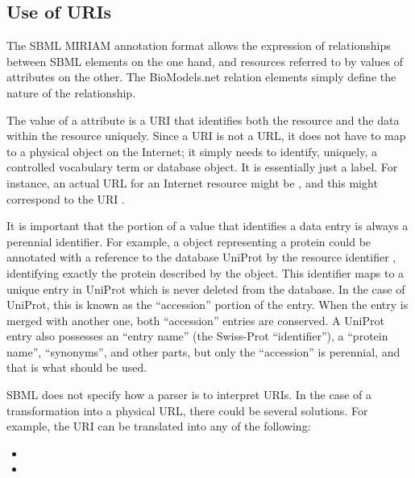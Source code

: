 
\subsection{Use of URIs}
\label{sec:uri-in-annotation}

The SBML MIRIAM annotation format allows the expression of
relationships between SBML elements on the one hand, and resources
referred to by values of  attributes on the
other.  The BioModels.net relation elements simply define the
nature of the relationship.

The value of a  attribute is a URI that
identifies both the resource and the data within the resource
uniquely.  Since a URI is not a URL, it does not have to map to a
physical object on the Internet; it simply needs to identify,
uniquely, a controlled vocabulary term or database object.  It is
essentially just a label.  For instance, an actual URL for an
Internet resource might be
, and this might
correspond to the URI .

It is important that the portion of a  value
that identifies a data entry is always a perennial identifier.
For example, a \Species object representing a protein could be
annotated with a reference to the database UniProt by the resource
identifier , identifying exactly
the protein described by the \Species object.  This identifier
maps to a unique entry in UniProt which is never deleted from the
database.  In the case of UniProt, this is known as the
``accession'' portion of the entry.  When the entry is merged with
another one, both ``accession'' entries are conserved.  A UniProt
entry also possesses an ``entry name'' (the Swiss-Prot
``identifier''), a ``protein name'', ``synonyms'', and other
parts, but only the ``accession'' is perennial, and that is what
should be used.

SBML does not specify how a parser is to interpret URIs. In the
case of a transformation into a physical URL, there could be
several solutions. For example, the URI
 can be translated into any
of the following:
\begin{itemize}\setlength{\parskip}{-0.7ex}

\item {}
\item {}

\end{itemize}\vspace*{-0.5ex}

